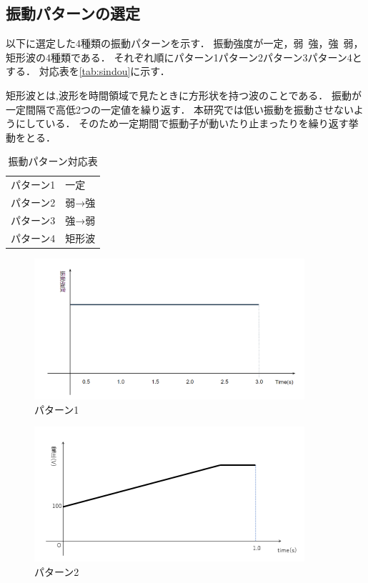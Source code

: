 \newpage
\subsection{振動パターンの選定}
以下に選定した4種類の振動パターンを示す．
振動強度が一定，弱~強，強~弱，矩形波の4種類である．
それぞれ順にパターン1パターン2パターン3パターン4とする．
対応表を\ref{tab:sindou}に示す．

矩形波とは,波形を時間領域で見たときに方形状を持つ波のことである．
振動が一定間隔で高低2つの一定値を繰り返す．
本研究では低い振動を振動させないようにしている．
そのため一定期間で振動子が動いたり止まったりを繰り返す挙動をとる．

\begin{table}[H]
    \caption{\label{tab;sindou}振動パターン対応表}
    \centering
    \begin{tabular}{l|l}
    \hline
    \hline
    パターン1 & 一定 \\
    パターン2 & 弱→強 \\
    パターン3 & 強→弱 \\
    パターン4 & 矩形波 \\
    \hline
    \end{tabular}
\end{table}


\begin{figure}[h]
\centering
\includegraphics[clip,width=10cm]{./fig/patarn1.png}
\caption{パターン1}\label{patarn1}
\end{figure}

\begin{figure}[h]
\centering
\includegraphics[clip,width=10cm]{./fig/patarn2.png}
\caption{パターン2}\label{patarn2}
\end{figure}

